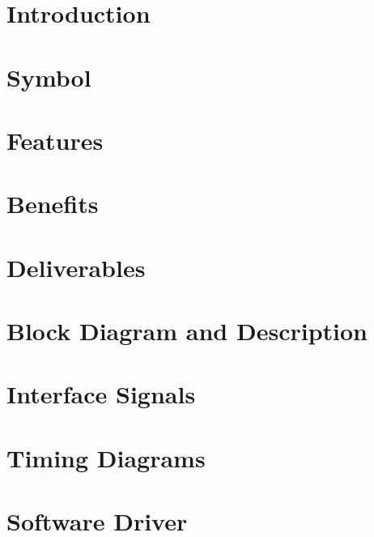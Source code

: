 \documentclass{\TEX/ug/ug}
\begin{document}
\maketitle
\cleardoublepage
\tableofcontents
\listoftables
\listoffigures
\cleardoublepage

\section{Introduction}
\label{sec:intro}


\section{Symbol}
\label{sec:symb}


\section{Features}
\label{sec:feat}


\section{Benefits}
\label{sec:benef}


\section{Deliverables}
\label{sec:deliv}


\section{Block Diagram and Description}
\label{sec:bdd}


\section{Interface Signals}
\label{sec:ifsig}


\ifdefined\TD
\section{Timing Diagrams}
\label{sec:td}

\fi

\ifdefined\SW
\section{Software Driver}
\label{sec:sw}

\fi
\end{document}
